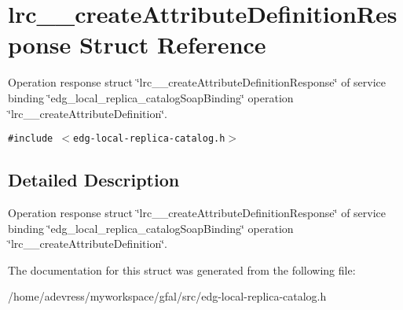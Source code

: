 \section{lrc\_\-\_\-create\-Attribute\-Definition\-Response Struct Reference}
\label{structlrc____createAttributeDefinitionResponse}
Operation response struct \char`\"{}lrc\_\-\_\-create\-Attribute\-Definition\-Response\char`\"{} of service binding \char`\"{}edg\_\-local\_\-replica\_\-catalog\-Soap\-Binding\char`\"{} operation \char`\"{}lrc\_\-\_\-create\-Attribute\-Definition\char`\"{}.  


{\tt \#include $<$edg-local-replica-catalog.h$>$}



\subsection{Detailed Description}
Operation response struct \char`\"{}lrc\_\-\_\-create\-Attribute\-Definition\-Response\char`\"{} of service binding \char`\"{}edg\_\-local\_\-replica\_\-catalog\-Soap\-Binding\char`\"{} operation \char`\"{}lrc\_\-\_\-create\-Attribute\-Definition\char`\"{}. 



The documentation for this struct was generated from the following file:\begin{CompactItemize}
\item 
/home/adevress/myworkspace/gfal/src/edg-local-replica-catalog.h\end{CompactItemize}
